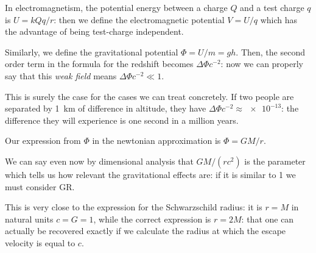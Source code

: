 \documentclass[main.tex]{subfiles}
\begin{document}
In electromagnetism, the potential energy between a charge \(Q\) and a test charge \(q\) is \(U = k Qq/r\): then we define the electromagnetic potential \(V = U/q\) which has the advantage of being test-charge independent.

Similarly, we define the gravitational potential \(\Phi = U/m = gh\).
Then, the second order term in the formula for the redshift becomes \(\Delta \Phi c^{-2}\): now we can properly say that this \emph{weak field} means \(\Delta \Phi c^{-2} \ll 1\).

This is surely the case for the cases we can treat concretely.
If two people are separated by \SI{1}{km} of difference in altitude, they have \(\Delta \Phi c^{-2} \approx \num{e-13} \): the difference they will experience is one second in a million years.

Our expression from \(\Phi \) in the newtonian approximation is \(\Phi = GM /r\).

We can say even now by dimensional analysis that \(GM / (rc^2)\) is the parameter which tells us how relevant the gravitational effects are: if it is similar to 1 we must consider GR.

This is very close to the expression for the Schwarzschild radius: it is \(r=M\) in natural units \(c=G=1\), while the correct expression is \(r= 2M\): that one can actually be recovered exactly if we calculate the radius at which the escape velocity is equal to \(c\).
\end{document}
